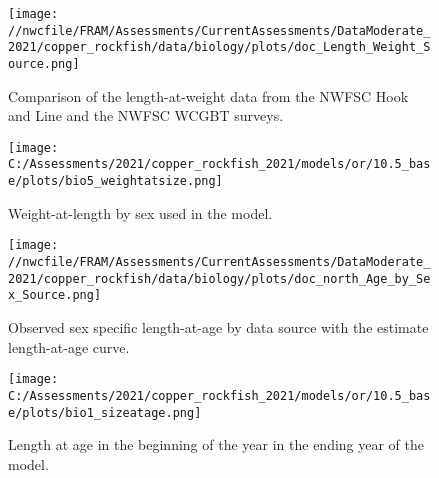 \documentclass[11pt,
  english,
  a4paper,
]{article}
\begin{document}
\tagmcend\tagstructend


\begin{figure}
\centering
\texttt{[image: //nwcfile/FRAM/Assessments/CurrentAssessments/DataModerate\_2021/copper\_rockfish/data/biology/plots/doc\_Length\_Weight\_Source.png]}
\caption{Comparison of the length-at-weight data from the NWFSC Hook and Line and the NWFSC WCGBT surveys.\label{fig:len-weight-survey}}
\end{figure}

\tagmcend\tagstructend


\begin{figure}
\centering
\texttt{[image: C:/Assessments/2021/copper\_rockfish\_2021/models/or/10.5\_base/plots/bio5\_weightatsize.png]}
\caption{Weight-at-length by sex used in the model.\label{fig:len-weight}}
\end{figure}

\tagmcend\tagstructend


\begin{figure}
\centering
\texttt{[image: //nwcfile/FRAM/Assessments/CurrentAssessments/DataModerate\_2021/copper\_rockfish/data/biology/plots/doc\_north\_Age\_by\_Sex\_Source.png]}
\caption{Observed sex specific length-at-age by data source with the estimate length-at-age curve.\label{fig:len-age-data}}
\end{figure}

\tagmcend\tagstructend


\begin{figure}
\centering
\texttt{[image: C:/Assessments/2021/copper\_rockfish\_2021/models/or/10.5\_base/plots/bio1\_sizeatage.png]}
\caption{Length at age in the beginning of the year in the ending year of the model.\label{fig:len-age-ss}}
\end{figure}
\end{document}
